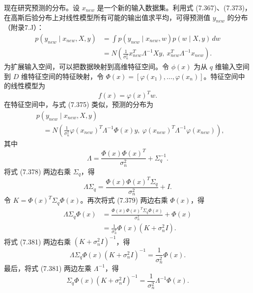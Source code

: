 现在研究预测的分布。设 $x_{new}$ 是一个新的输入数据集。利用式 (7.367)、(7.373)，在高斯后验分布上对线性模型所有可能的输出值求平均，可得预测值 $y_{new}$ 的分布（附录7.J）：
\begin{equation}
\begin{aligned}
p(y_{new}\mid x_{new},X,y)
&=\int p(y_{new}\mid x_{new},w)p(w\mid X,y)\,dw\\
&=N\left(\frac1{\sigma_n^2}x_{new}^T\Lambda^{-1}Xy,\ x_{new}^T\Lambda^{-1}x_{new}\right).
\end{aligned}
\tag{7.375}
\end{equation}
为扩展输入空间，可以把数据映射到高维特征空间。令 $\phi(x)$ 为从 $q$ 维输入空间到 $D$ 维特征空间的特征映射，令 $\Phi(x)=[\varphi(x_1),\ldots,\varphi(x_n)]$。特征空间中的线性模型为
\begin{equation}
f(x)=\varphi(x)^Tw.
\tag{7.376}
\end{equation}
在特征空间中，与式 (7.375) 类似，预测的分布为
\begin{equation}
\begin{aligned}
&p(y_{new}\mid x_{new},X,y)\\
&\quad=N\left(\frac1{\sigma_n^2}\varphi(x_{new})^T\Lambda^{-1}\Phi(x)y,\
\varphi(x_{new})^T\Lambda^{-1}\varphi(x_{new})\right),
\end{aligned}
\tag{7.377}
\end{equation}
其中
\begin{equation}
\Lambda=\frac{\Phi(x)\Phi(x)^T}{\sigma_n^2}+\Sigma_q^{-1}.
\tag{7.378}
\end{equation}
将式 (7.378) 两边右乘 $\Sigma_q$，得
\begin{equation}
\Lambda\Sigma_q=\frac{\Phi(x)\Phi(x)^T\Sigma_q}{\sigma_n^2}+I.
\tag{7.379}
\end{equation}
令 $K=\Phi(x)^T\Sigma_q\Phi(x)$。再次将式 (7.379) 两边右乘 $\Phi(x)$，得
\begin{equation}
\begin{aligned}
\Lambda\Sigma_q\Phi(x)&=\frac{\Phi(x)\Phi(x)^T\Sigma_q\Phi(x)}{\sigma_n^2}+\Phi(x)\\
&=\frac1{\sigma_n^2}\Phi(x)(K+\sigma_n^2I).
\end{aligned}
\tag{7.380}
\end{equation}
将式 (7.381) 两边右乘 $(K+\sigma_n^2I)^{-1}$，得
\begin{equation}
\Lambda\Sigma_q\Phi(x)(K+\sigma_n^2I)^{-1}=\frac1{\sigma_n^2}\Phi(x).
\tag{7.381}
\end{equation}
最后，将式 (7.381) 两边左乘 $\Lambda^{-1}$，得
\begin{equation}
\Sigma_q\Phi(x)(K+\sigma_n^2I)^{-1}=\frac1{\sigma_n^2}\Lambda^{-1}\Phi(x).
\tag{7.382}
\end{equation}
